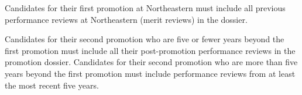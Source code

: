 Candidates for their first promotion at Northeastern must include all previous performance reviews at Northeastern (merit reviews) in the dossier.

Candidates for their second promotion who are five or fewer years beyond the first promotion must include all their post-promotion performance reviews in the promotion dossier. 
Candidates for their second promotion who are more than five years beyond the first promotion must include performance reviews from at least the most recent five years.



